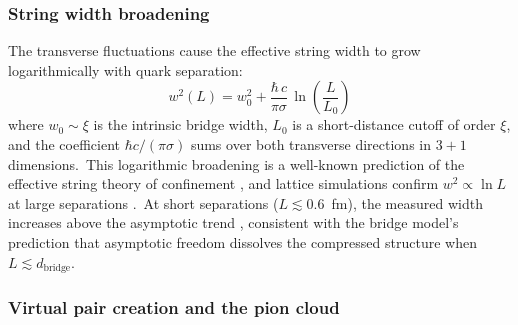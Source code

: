 ﻿\documentclass[12pt,letterpaper]{article}
\begin{document}
\subsubsection*{String width broadening}

The transverse fluctuations cause the effective string width to
grow logarithmically with quark separation:
%
\begin{equation}
  \label{eq:string-width}
  w^2(L) = w_0^2 + \frac{\hbar\,c}{\pi\sigma}\,\ln\!\left(\frac{L}{L_0}\right)
\end{equation}
%
where $w_0 \sim \xi$ is the intrinsic bridge width, $L_0$ is a
short-distance cutoff of order $\xi$, and the coefficient $\hbar c/(\pi\sigma)$
sums over both transverse directions in $3{+}1$ dimensions.\ This
logarithmic broadening is a well-known prediction of the effective string
theory of confinement \cite{luscher2002}, and lattice simulations confirm
$w^2 \propto \ln L$ at large separations \cite{cardoso2013,cea2024}.\ At short separations
($L \lesssim 0.6$~fm), the measured width increases above the
asymptotic trend \cite{cea2024}, consistent with the bridge model's prediction
that asymptotic freedom dissolves the compressed structure when
$L \lesssim d_{\mathrm{bridge}}$.

\subsubsection*{Virtual pair creation and the pion cloud}
\end{document}
